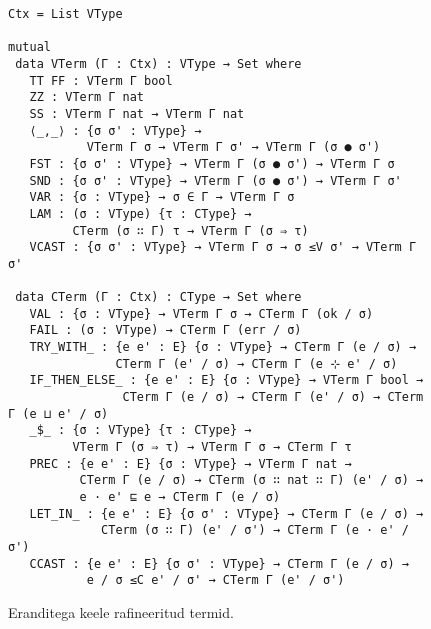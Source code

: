 \documentclass[a4paper,12pt]{article}
\begin{document}
\begin{figure}
  \begin{BVerbatim}
Ctx = List VType

mutual
 data VTerm (Γ : Ctx) : VType → Set where
   TT FF : VTerm Γ bool
   ZZ : VTerm Γ nat
   SS : VTerm Γ nat → VTerm Γ nat
   ⟨_,_⟩ : {σ σ' : VType} →
           VTerm Γ σ → VTerm Γ σ' → VTerm Γ (σ ● σ')
   FST : {σ σ' : VType} → VTerm Γ (σ ● σ') → VTerm Γ σ
   SND : {σ σ' : VType} → VTerm Γ (σ ● σ') → VTerm Γ σ'
   VAR : {σ : VType} → σ ∈ Γ → VTerm Γ σ
   LAM : (σ : VType) {τ : CType} →
         CTerm (σ ∷ Γ) τ → VTerm Γ (σ ⇒ τ)
   VCAST : {σ σ' : VType} → VTerm Γ σ → σ ≤V σ' → VTerm Γ σ'

 data CTerm (Γ : Ctx) : CType → Set where
   VAL : {σ : VType} → VTerm Γ σ → CTerm Γ (ok / σ)
   FAIL : (σ : VType) → CTerm Γ (err / σ)
   TRY_WITH_ : {e e' : E} {σ : VType} → CTerm Γ (e / σ) →
               CTerm Γ (e' / σ) → CTerm Γ (e ⊹ e' / σ)
   IF_THEN_ELSE_ : {e e' : E} {σ : VType} → VTerm Γ bool →
                CTerm Γ (e / σ) → CTerm Γ (e' / σ) → CTerm Γ (e ⊔ e' / σ)
   _$_ : {σ : VType} {τ : CType} →
         VTerm Γ (σ ⇒ τ) → VTerm Γ σ → CTerm Γ τ
   PREC : {e e' : E} {σ : VType} → VTerm Γ nat →
          CTerm Γ (e / σ) → CTerm (σ ∷ nat ∷ Γ) (e' / σ) →
          e · e' ⊑ e → CTerm Γ (e / σ)
   LET_IN_ : {e e' : E} {σ σ' : VType} → CTerm Γ (e / σ) →
             CTerm (σ ∷ Γ) (e' / σ') → CTerm Γ (e · e' / σ')
   CCAST : {e e' : E} {σ σ' : VType} → CTerm Γ (e / σ) →
           e / σ ≤C e' / σ' → CTerm Γ (e' / σ')
  \end{BVerbatim}
  \caption{Eranditega keele rafineeritud termid.}
  \label{fig:exc.refined}
\end{figure}
\end{document}

